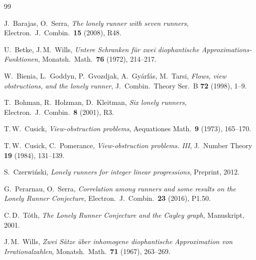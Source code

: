 \documentclass[12pt,a4paper]{amsart}
\theoremstyle{definition}
\theoremstyle{remark}
\begin{document}
\begin{thebibliography}{99}

J.~Barajas, O.~Serra,
\textit{The lonely runner with seven runners},
Electron.\ J.\ Combin.\ \textbf{15} (2008), R48.

U.~Betke, J.\,M.~Wills,
\textit{Untere Schranken für zwei diophantische Approximations-Funktionen},
Monatsh.\ Math.\ \textbf{76} (1972), 214--217.

W.~Bienia, L.~Goddyn, P.~Gvozdjak, A.~Gyárfás, M.~Tarsi,
\textit{Flows, view obstructions, and the lonely runner},
J.\ Combin.\ Theory Ser.\ B \textbf{72} (1998), 1--9.

T.~Bohman, R.~Holzman, D.~Kleitman,
\textit{Six lonely runners},
Electron.\ J.\ Combin.\ \textbf{8} (2001), R3.

T.\,W.~Cusick,
\textit{View-obstruction problems},
Aequationes Math.\ \textbf{9} (1973), 165--170.

T.\,W.~Cusick, C.~Pomerance,
\textit{View-obstruction problems. III},
J.\ Number Theory \textbf{19} (1984), 131--139.

S.~Czerwi\'nski,
\textit{Lonely runners for integer linear progressions},
Preprint, 2012.

G.~Perarnau, O.~Serra,
\textit{Correlation among runners and some results on the Lonely Runner Conjecture},
Electron.\ J.\ Combin.\ \textbf{23} (2016), P1.50.

C.\,D.~Tóth,
\textit{The Lonely Runner Conjecture and the Cayley graph},
Manuskript, 2001.

J.\,M.~Wills,
\textit{Zwei Sätze über inhomogene diophantische Approximation von Irrationalzahlen},
Monatsh.\ Math.\ \textbf{71} (1967), 263--269.

\end{thebibliography}
\end{document}
